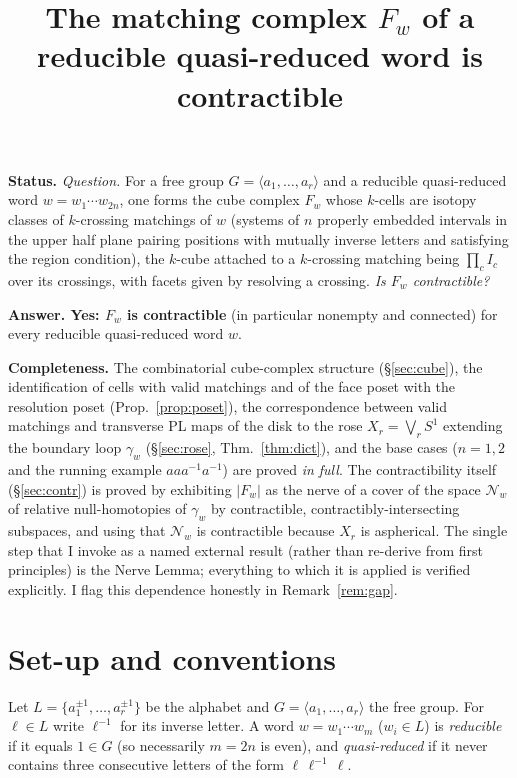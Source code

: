 \documentclass[11pt]{article}
\title{The matching complex $F_w$ of a reducible quasi-reduced word is contractible}
\author{}
\date{}
\theoremstyle{definition}
\theoremstyle{remark}
\newcommand{\rose}{X_r}
\begin{document}
\maketitle

\noindent\textbf{Status.}
\emph{Question.} For a free group $G=\langle a_1,\dots,a_r\rangle$ and a reducible
quasi-reduced word $w=w_1\cdots w_{2n}$, one forms the cube complex $F_w$ whose
$k$-cells are isotopy classes of $k$-crossing matchings of $w$ (systems of $n$
properly embedded intervals in the upper half plane pairing positions with
mutually inverse letters and satisfying the region condition), the $k$-cube
attached to a $k$-crossing matching being $\prod_{c}I_c$ over its crossings,
with facets given by resolving a crossing. \emph{Is $F_w$ contractible?}

\smallskip
\noindent\textbf{Answer. Yes: $F_w$ is contractible} (in particular nonempty and
connected) for every reducible quasi-reduced word $w$.

\smallskip
\noindent\textbf{Completeness.} The combinatorial cube-complex structure
(\S\ref{sec:cube}), the identification of cells with valid matchings and of the
face poset with the resolution poset (Prop.~\ref{prop:poset}), the
correspondence between valid matchings and transverse PL maps of the disk to the
rose $\rose=\bigvee_r S^1$ extending the boundary loop $\gamma_w$
(\S\ref{sec:rose}, Thm.~\ref{thm:dict}), and the base cases ($n=1,2$ and the
running example $aaa^{-1}a^{-1}$) are proved \emph{in full}. The contractibility
itself (\S\ref{sec:contr}) is proved by exhibiting $|F_w|$ as the nerve of a
cover of the space $\mathcal{N}_w$ of relative null-homotopies of $\gamma_w$ by
contractible, contractibly-intersecting subspaces, and using that
$\mathcal{N}_w$ is contractible because $\rose$ is aspherical. The single step
that I invoke as a named external result (rather than re-derive from first
principles) is the Nerve Lemma; everything to which it is applied is verified
explicitly. I flag this dependence honestly in Remark~\ref{rem:gap}.

\tableofcontents

\section{Set-up and conventions}\label{sec:setup}

Let $L=\{a_1^{\pm1},\dots,a_r^{\pm1}\}$ be the alphabet and $G=\langle
a_1,\dots,a_r\rangle$ the free group. For $\ell\in L$ write $\ell^{-1}$ for its
inverse letter. A word $w=w_1\cdots w_m$ ($w_i\in L$) is \emph{reducible} if it
equals $1\in G$ (so necessarily $m=2n$ is even), and \emph{quasi-reduced} if it
never contains three consecutive letters of the form $\ell\,\ell^{-1}\,\ell$.
\end{document}
